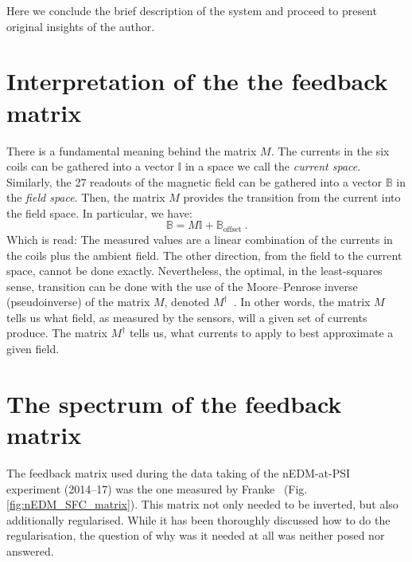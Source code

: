 Here we conclude the brief description of the system and proceed to present original insights of the author.



\section{Interpretation of the the feedback matrix}
There is a fundamental meaning behind the matrix $M$. The currents in the six coils can be gathered into a vector $\mathbb{I}$ in a space we call the \emph{current space}. Similarly, the 27 readouts of the magnetic field can be gathered into a vector $\mathbb{B}$ in the \emph{field space}. Then, the matrix $M$ provides the transition from the current into the field space. In particular, we have:
\begin{equation}
  \mathbb{B} = M \mathbb{I} + \mathbb{B}_\text{offset} \ .
\end{equation}
Which is read: The measured values are a linear combination of the currents in the coils plus the ambient field.
The other direction, from the field to the current space, cannot be done exactly. Nevertheless, the optimal, in the least-squares sense, transition can be done with the use of the Moore--Penrose inverse (pseudoinverse) of the matrix $M$, denoted $M^\dagger$~\cite{penrose_1955}.
In other words, the matrix $M$ tells us what field, as measured by the sensors, will a given set of currents produce. The matrix $M^\dagger$ tells us, what currents to apply to best approximate a given field.



\section{The spectrum of the feedback matrix}
\label{sec:nedm_sfc_matrix}
The feedback matrix used during the data taking of the nEDM-at-PSI experiment (2014--17) was the one measured by Franke~\cite{Franke2013} (Fig.\,\ref{fig:nEDM_SFC_matrix}). This matrix not only needed to be inverted, but also additionally regularised. While it has been thoroughly discussed how to do the regularisation, the question of why was it needed at all was neither posed nor answered.


